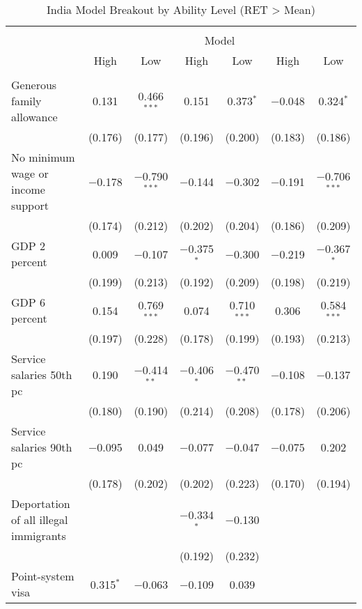 
\begin{sidewaystable}[!htbp] \centering 
  \caption{India Model Breakout by Ability Level (RET > Mean)} 
  \label{tab:india_ability} 
\begin{tabular}{@{\extracolsep{5pt}}lcccccc} 
\\[-1.8ex]\hline 
\hline \\[-1.8ex] 
 & \multicolumn{6}{c}{Model} \\ 
\cline{2-7} 
 & High & Low & High & Low & High & Low \\ 
\hline \\[-1.8ex] 
 Generous family allowance & 0.131 & 0.466$^{***}$ & 0.151 & 0.373$^{*}$ & $-$0.048 & 0.324$^{*}$ \\ 
  & (0.176) & (0.177) & (0.196) & (0.200) & (0.183) & (0.186) \\ 
  No minimum wage or income support & $-$0.178 & $-$0.790$^{***}$ & $-$0.144 & $-$0.302 & $-$0.191 & $-$0.706$^{***}$ \\ 
  & (0.174) & (0.212) & (0.202) & (0.204) & (0.186) & (0.209) \\ 
  GDP 2 percent & 0.009 & $-$0.107 & $-$0.375$^{*}$ & $-$0.300 & $-$0.219 & $-$0.367$^{*}$ \\ 
  & (0.199) & (0.213) & (0.192) & (0.209) & (0.198) & (0.219) \\ 
  GDP 6 percent & 0.154 & 0.769$^{***}$ & 0.074 & 0.710$^{***}$ & 0.306 & 0.584$^{***}$ \\ 
  & (0.197) & (0.228) & (0.178) & (0.199) & (0.193) & (0.213) \\ 
  Service salaries 50th pc & 0.190 & $-$0.414$^{**}$ & $-$0.406$^{*}$ & $-$0.470$^{**}$ & $-$0.108 & $-$0.137 \\ 
  & (0.180) & (0.190) & (0.214) & (0.208) & (0.178) & (0.206) \\ 
  Service salaries 90th pc & $-$0.095 & 0.049 & $-$0.077 & $-$0.047 & $-$0.075 & 0.202 \\ 
  & (0.178) & (0.202) & (0.202) & (0.223) & (0.170) & (0.194) \\ 
  Deportation of all illegal immigrants &  &  & $-$0.334$^{*}$ & $-$0.130 &  &  \\ 
  &  &  & (0.192) & (0.232) &  &  \\ 
  Point-system visa & 0.315$^{*}$ & $-$0.063 & $-$0.109 & 0.039 &  &  \\ 

\end{tabular}
\end{sidewaystable}
